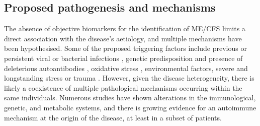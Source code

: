


\subsection{Proposed pathogenesis and mechanisms}
\label{subsec:pathogenesis}

The absence of objective biomarkers for the identification of ME/CFS limits a direct association with the disease's aetiology, and multiple mechanisms have been hypothesised.
Some of the proposed triggering factors include previous or persistent viral or bacterial infections \citep{rasa2018ChronicViral}, genetic predisposition and presence of deleterious autoantibodies \citep{wirth2020UnifyingHypothesis}, oxidative stress \citep{wood2021RoleMitochondria}, environmental factors, severe and longstanding stress or trauma \citep{rivera2019MyalgicEncephalomyelitis}.
However, given the disease heterogeneity, there is likely a coexistence of multiple pathological mechanisms occurring within the same individuals.
Numerous studies have shown alterations in the immunological, genetic, and metabolic systems, and there is growing evidence for an autoimmune mechanism at the origin of the disease, at least in a subset of patients.


